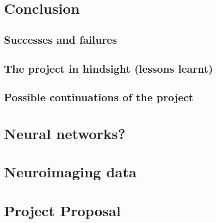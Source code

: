 \documentclass[12pt,a4paper,twoside, openright, hidelinks]{report}
\begin{document}
\chapter{Conclusion}


\section{Successes and failures}

\section{The project in hindsight (lessons learnt)}

\section{Possible continuations of the project}





\appendix
\chapter{Neural networks?}

\chapter{Neuroimaging data}

\chapter{Project Proposal}


\end{document}
